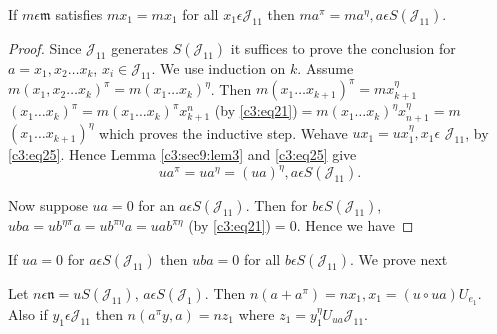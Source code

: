 \begin{lemma}\label{c3:sec9:lem3} 
  If $m\epsilon \mathfrak{m}$ satisfies $mx_1=mx_1$ for all $x_1\epsilon
  \mathscr{J}_{11}$ then $ma^{\pi}=ma^{\eta}, a\epsilon S(\mathscr{J}_{11})$.
\end{lemma}

\begin{proof}
Since $\mathscr{J}_{11}$ generates $S(\mathscr{J}_{11})$ it suffices
to prove the conclusion for $a=x_1,x_2\ldots x_k$, $x_i \in
\mathscr{J}_{11}$. We use induction on $k$. Assume $m(x_1,x_2\ldots
x_k)^{\pi}=m(x_1\ldots x_k)^{\eta}$. Then $m(x_1\ldots
x_{k+1})^{\pi}=mx_{k+1}^{\eta}$ $(x_1\ldots x_k)^{\pi}=m(x_1\ldots
x_k)^{\pi}x^{n}_{k+1}$ (by \eqref{c3:eq21})$=m(x_1\ldots x_k)^{\eta}
x^{\eta}_{n+1}=m$ \break $(x_1\ldots x_{k+1})^{\eta}$ which proves the inductive
step. We\pageoriginale have $ux_1=ux^{\eta}_1, x_1\epsilon$
 $\mathscr{J}_{11}$, by \eqref{c3:eq25}. Hence Lemma \ref{c3:sec9:lem3}
and \eqref{c3:eq25} give 
\begin{equation*}
  ua^{\pi}=ua^{\eta}=(ua)^{\eta},a\epsilon
  S(\mathscr{J}_{11})\tag{27}.\label{c3:eq27} 
\end{equation*}

Now suppose $ua=0$ for an $a\epsilon S(\mathscr{J}_{11})$. Then for
$b\epsilon S(\mathscr{J}_{11})$, $uba=u b^{\eta\pi}a=ub^{\pi
\eta}a=uab^{\pi \eta}$ (by \eqref{c3:eq21})$=0$. Hence we have
\end{proof}

\begin{lemma}\label{c3:sec9:lem4} 
  If $ua=0$ for $a\epsilon S(\mathscr{J}_{11})$ then $uba=0$ for all
  $b\epsilon S(\mathscr{J}_{11})$.
  We prove next
\end{lemma}

\begin{lemma}\label{c3:sec9:lem5} 
  Let $n\epsilon \mathfrak{n}=uS(\mathscr{J}_{11})$, $a\epsilon
  S(\mathscr{J}_{1})$. Then $n(a+a^{\pi})=nx_1,x_1=(u\circ
  ua)U_{e_1}$. Also if $y_1\epsilon \mathscr{J}_{11}$ then
  $n(a^{\pi}y,a)=nz_1$ where $z_1=y^{\eta}_{1}U_{ua} \mathscr{J}_{11}$.
\end{lemma}

